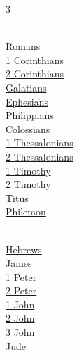 \begin{multicols}{3}
\columnbreak

\\
\hspace{1em}\hyperlink{book-romans}{Romans}\\
\hspace{1em}\hyperlink{book-1corinthians}{1 Corinthians}\\
\hspace{1em}\hyperlink{book-2corinthians}{2 Corinthians}\\
\hspace{1em}\hyperlink{book-galatians}{Galatians}\\
\hspace{1em}\hyperlink{book-ephesians}{Ephesians}\\
\hspace{1em}\hyperlink{book-philippians}{Philippians}\\
\hspace{1em}\hyperlink{book-colossians}{Colossians}\\
\hspace{1em}\hyperlink{book-1thessalonians}{1 Thessalonians}\\
\hspace{1em}\hyperlink{book-2thessalonians}{2 Thessalonians}\\
\hspace{1em}\hyperlink{book-1timothy}{1 Timothy}\\
\hspace{1em}\hyperlink{book-2timothy}{2 Timothy}\\
\hspace{1em}\hyperlink{book-titus}{Titus}\\
\hspace{1em}\hyperlink{book-philemon}{Philemon}\\
\vspace{4pt}

\\
\hspace{1em}\hyperlink{book-hebrews}{Hebrews}\\
\hspace{1em}\hyperlink{book-james}{James}\\
\hspace{1em}\hyperlink{book-1peter}{1 Peter}\\
\hspace{1em}\hyperlink{book-2peter}{2 Peter}\\
\hspace{1em}\hyperlink{book-1john}{1 John}\\
\hspace{1em}\hyperlink{book-2john}{2 John}\\
\hspace{1em}\hyperlink{book-3john}{3 John}\\
\hspace{1em}\hyperlink{book-jude}{Jude}\\
\vspace{4pt}


\end{multicols}
